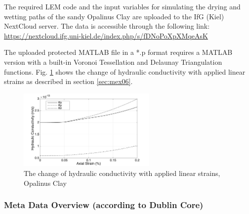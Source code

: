 The required LEM code and the input variables for simulating the drying and wetting paths of the sandy Opalinus Clay are uploaded to the IfG (Kiel) NextCloud server. The data is accessible through the following link:\\
\url{https://nextcloud.ifg.uni-kiel.de/index.php/s/fDNoPoXpXMqeAsK}

The uploaded protected MATLAB file in a *.p format requires a MATLAB version with a built-in Voronoi Tessellation and Delaunay Triangulation functions. Fig. \ref{fig:Amir_ME6_Lattice_Drying_Data} shows the change of hydraulic conductivity with applied linear strains as described in section \ref {sec:mex06}. 

\begin{figure}[!ht]
\centering
\includegraphics[width=0.6\textwidth]{figures/Amir_ME6_Lattice_Drying_Data.png}
\caption{The change of hydraulic conductivity with applied linear strains, Opalinus Clay}
\label{fig:Amir_ME6_Lattice_Drying_Data}
\end{figure}

\subsubsection*{Meta Data Overview (according to Dublin Core)}

